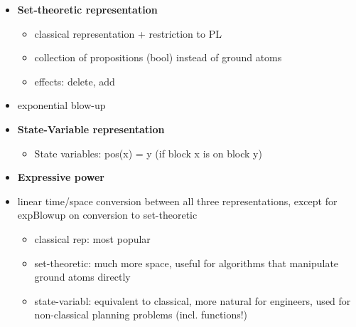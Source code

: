 \begin{itemize}
\item \textbf{Set-theoretic representation}

	\begin{itemize}
	\item classical representation + restriction to PL
	\item collection of propositions (bool) instead of ground atoms
	\item effects: delete, add
	\end{itemize}
\item exponential blow-up		
\end{itemize}

\begin{itemize}
\item \textbf{State-Variable representation}

	\begin{itemize}
	\item State variables: pos(x) = y (if block x is on block y)
	\end{itemize}
\end{itemize}

\begin{itemize}
\item \textbf{Expressive power}
\item linear time/space conversion between all three representations, except for expBlowup on conversion to set-theoretic
	\begin{itemize}
	\item classical rep: most popular
	\item set-theoretic: much more space, useful for algorithms that manipulate ground atoms directly
	\item state-variabl: equivalent to classical, more natural for engineers, used for non-classical planning problems (incl. functions!) 	
	\end{itemize}
\end{itemize}